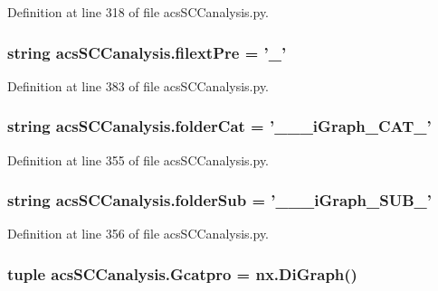 Definition at line 318 of file acs\+S\+C\+Canalysis.\+py.

\hypertarget{a00130_a60ff937c050eef601bd84134d1913d8a}{
\subsubsection[{filext\+Pre}]{\setlength{\rightskip}{0pt plus 5cm}string acs\+S\+C\+Canalysis.\+filext\+Pre = '\+\_\+'}}\label{a00130_a60ff937c050eef601bd84134d1913d8a}


Definition at line 383 of file acs\+S\+C\+Canalysis.\+py.

\hypertarget{a00130_a1cbfd083273176eebfe0260e8384acef}{
\subsubsection[{folder\+Cat}]{\setlength{\rightskip}{0pt plus 5cm}string acs\+S\+C\+Canalysis.\+folder\+Cat = '\+\_\+\+\_\+\_\+i\+Graph\+\_\+\+C\+A\+T\+\_\+'}}\label{a00130_a1cbfd083273176eebfe0260e8384acef}


Definition at line 355 of file acs\+S\+C\+Canalysis.\+py.

\hypertarget{a00130_a90c2bcabbdb271c2c3347ebea4c259bc}{
\subsubsection[{folder\+Sub}]{\setlength{\rightskip}{0pt plus 5cm}string acs\+S\+C\+Canalysis.\+folder\+Sub = '\+\_\+\+\_\+\_\+i\+Graph\+\_\+\+S\+U\+B\+\_\+'}}\label{a00130_a90c2bcabbdb271c2c3347ebea4c259bc}


Definition at line 356 of file acs\+S\+C\+Canalysis.\+py.

\hypertarget{a00130_ad88c3dd8eb89ddbe8720462b03f35003}{
\subsubsection[{Gcatpro}]{\setlength{\rightskip}{0pt plus 5cm}tuple acs\+S\+C\+Canalysis.\+Gcatpro = nx.\+Di\+Graph()}}\label{a00130_ad88c3dd8eb89ddbe8720462b03f35003}


